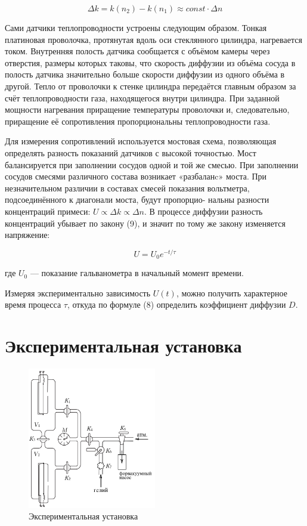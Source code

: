 \documentclass[a4paper]{article}
\begin{document}
\begin{equation}
    \Delta k = k(n_2) - k(n_1) \approx const \cdot \Delta n
\end{equation}

Сами датчики теплопроводности устроены следующим образом. Тонкая
платиновая проволочка, протянутая вдоль оси стеклянного цилиндра,
нагревается током. Внутренняя полость датчика сообщается с объёмом
камеры через отверстия, размеры которых таковы, что скорость диффузии
из объёма сосуда в полость датчика значительно больше скорости диффузии
из одного объёма в другой. Тепло от проволочки к стенке
цилиндра передаётся главным образом за счёт теплопроводности газа, находящегося
внутри цилиндра. При заданной мощности нагревания приращение
температуры проволочки и, следовательно, приращение её сопротивления
пропорциональны теплопроводности газа.

Для измерения сопротивлений используется мостовая схема, позволяющая
определять разность показаний датчиков с высокой точностью.
Мост балансируется при заполнении сосудов одной и той же
смесью. При заполнении сосудов смесями различного состава возникает
«разбаланc» моста. При незначительном различии в составах смесей показания
вольтметра, подсоединённого к диагонали моста, будут пропорцио-
нальны разности концентраций примеси: $U \propto \Delta k \propto \Delta n$. В процессе
диффузии разность концентраций убывает по закону (9), и значит по тому
же закону изменяется напряжение:

\begin{equation}
    U = U_0 e^{-t/\tau}
\end{equation}

где $U_0$ — показание гальванометра в начальный момент времени.

Измеряя экспериментально зависимость $U(t)$, можно получить характерное время
процесса $\tau$, откуда по формуле (8) определить коэффициент диффузии $D$.

\newpage
\section{Экспериментальная установка}

\begin{figure}
    \centering
    \includegraphics[width = 0.50\textwidth]{ustanovka.png}
    \caption{Экспериментальная установка}
\end{figure}
\end{document}
